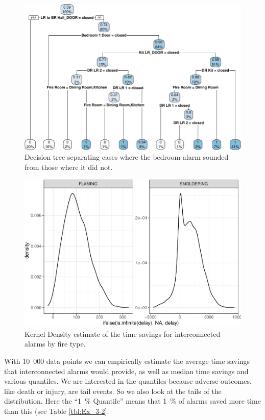 \documentclass[12pt,twoside]{book}
\begin{document}
\begin{figure}[h!]
\centering
\includegraphics[width=4.5in]{FIGURES/cart-1.pdf}
\caption{Decision tree separating cases where the bedroom alarm sounded from those where it did not.}
\label{Ex_3-decision_tree}
\end{figure}
\begin{figure}[h!]
\centering
\includegraphics[width=4.5in]{FIGURES/kde-1.pdf}
\caption{Kernel Density estimate of the time savings for interconnected alarms by fire type.}
\label{Ex_3-distributions}
\end{figure}

With 10~000 data points we can empirically estimate the average time savings that interconnected alarms would provide, as well as median time savings and various quantiles. We are interested in the quantiles because adverse outcomes, like death or injury, are tail events. So we also look at the tails of the distribution. Here the ``1~\% Quantile'' means that 1~\% of alarms saved more time than this (see Table \ref{tbl:Ex_3-2}.
\end{document}
